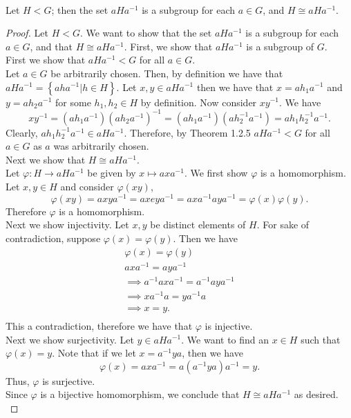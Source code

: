 \documentclass{article}
\begin{document}
\begin{problem}[Exercise 1.5.6] \\
    Let $H < G$; then the set $aHa^{-1}$ is a subgroup for each $a \in G$, and $H \cong aHa^{-1}$.
\end{problem}

\begin{proof}
    Let $H < G$. We want to show that the set $aHa^{-1}$ is a subgroup for each $a \in G$, and that $H \cong aHa^{-1}$. First, we show that $aHa^{-1}$ is a subgroup of $G$. \\
    First we show that $aHa^{-1} < G$ for all $a \in G$. \\
    Let $a \in G$ be arbitrarily chosen. Then, by definition we have that $aHa^{-1} = \left\{ aha^{-1} \vert h \in H \right\}$. Let $x,y \in aHa^{-1}$ then we have that $x = ah_1a^{-1}$ and $y = ah_2a^{-1}$ for some $h_1,h_2 \in H$ by definition. Now consider $xy^{-1}$. We have
    \[
        xy^{-1} = (ah_1a^{-1})(ah_2a^{-1})^{-1} = (ah_1a^{-1})(ah_2^{-1}a^{-1}) = ah_1h_2^{-1}a^{-1}.
    \]
    Clearly, $ah_1h_2^{-1}a^{-1} \in aHa^{-1}$. Therefore, by Theorem 1.2.5 $aHa^{-1} < G$ for all $a \in G$ as $a$ was arbitrarily chosen. \\
    Next we show that $H \cong aHa^{-1}$. \\
    Let $\varphi : H \to aHa^{-1}$ be given by $x \mapsto axa^{-1}$. We first show $\varphi$ is a homomorphism. \\
    Let $x,y \in H$ and consider $\varphi(xy)$,
    \[
        \varphi(xy) = axya^{-1} = axeya^{-1} = axa^{-1}aya^{-1} = \varphi(x)\varphi(y).
    \]
    Therefore $\varphi$ is a homomorphism. \\
    Next we show injectivity. Let $x,y$ be distinct elements of $H$. For sake of contradiction, suppose $\varphi(x) = \varphi(y)$. Then we have
    \begin{multline*}
        \varphi(x) = \varphi(y) \\
        axa^{-1} = aya^{-1} \\
        \implies a^{-1}axa^{-1} = a^{-1}aya^{-1} \\
        \implies xa^{-1}a = ya^{-1}a \\
        \implies x = y. \\
    \end{multline*}
    This a contradiction, therefore we have that $\varphi$ is injective. \\
    Next we show surjectivity. Let $y \in aHa^{-1}$. We want to find an $x \in H$ such that $\varphi(x) = y$. Note that if we let $x = a^{-1}ya$, then we have
    \[
        \varphi(x) = axa^{-1} = a(a^{-1}ya)a^{-1} = y.
    \]
    Thus, $\varphi$ is surjective. \\
    Since $\varphi$ is a bijective homomorphism, we conclude that $H \cong aHa^{-1}$ as desired. \\
\end{proof}
\end{document}

